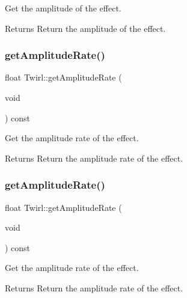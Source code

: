 Get the amplitude of the effect. 

\begin{DoxyReturn}{Returns}
Return the amplitude of the effect. 
\end{DoxyReturn}
\mbox{\label{classTwirl_afa43bbaf322404dfc8b09707639f5d04}} 
\subsubsection{\texorpdfstring{get\+Amplitude\+Rate()}{getAmplitudeRate()}\hspace{0.1cm}{\footnotesize\ttfamily [1/2]}}
{\footnotesize\ttfamily float Twirl\+::get\+Amplitude\+Rate (\begin{DoxyParamCaption}\item[{void}]{ }\end{DoxyParamCaption}) const\hspace{0.3cm}{\ttfamily [inline]}}



Get the amplitude rate of the effect. 

\begin{DoxyReturn}{Returns}
Return the amplitude rate of the effect. 
\end{DoxyReturn}
\mbox{\label{classTwirl_afa43bbaf322404dfc8b09707639f5d04}} 
\subsubsection{\texorpdfstring{get\+Amplitude\+Rate()}{getAmplitudeRate()}\hspace{0.1cm}{\footnotesize\ttfamily [2/2]}}
{\footnotesize\ttfamily float Twirl\+::get\+Amplitude\+Rate (\begin{DoxyParamCaption}\item[{void}]{ }\end{DoxyParamCaption}) const\hspace{0.3cm}{\ttfamily [inline]}}



Get the amplitude rate of the effect. 

\begin{DoxyReturn}{Returns}
Return the amplitude rate of the effect. 
\end{DoxyReturn}
\mbox{\label{classTwirl_aad84af7fd087bb5d5442b13737e1004d}} 
